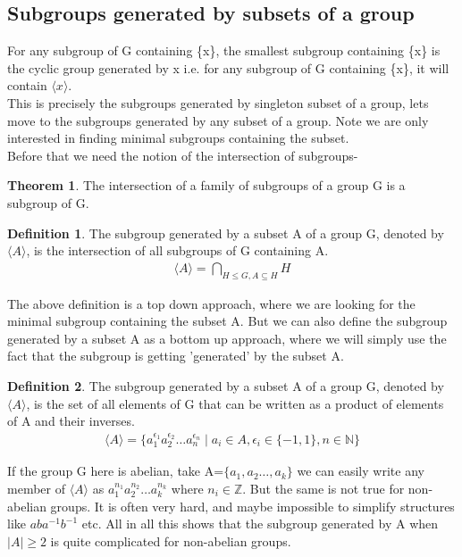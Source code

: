 \documentclass[12pt,a4paper,oneside]{report}
\theoremstyle{definition}
\newtheorem{definition}{Definition}[chapter]
\newtheorem{theorem}{Theorem}
\begin{document}
\subsection{Subgroups generated by subsets of a group}
For any subgroup of G containing \{x\}, the smallest subgroup containing \{x\} is the cyclic group generated by x i.e. for any subgroup of G containing \{x\}, it will contain $\langle x \rangle$.
\\This is precisely the subgroups generated by singleton subset of a group, lets move to the subgroups generated by any subset of a group. Note we are only interested in finding minimal subgroups containing the subset.
\\Before that we need the notion of the intersection of subgroups-
\begin{theorem}
  The intersection of a family of subgroups of a group G is a subgroup of G.
\end{theorem}
\begin{definition}
  The subgroup generated by a subset A of a group G, denoted by $\langle A \rangle$, is the intersection of all subgroups of G containing A.
  \begin{align*}
    \langle A \rangle = \bigcap_{H \leq G, A \subseteq H} H
  \end{align*}
\end{definition}
The above definition is a top down approach, where we are looking for the minimal subgroup containing the subset A. But we can also define the subgroup generated by a subset A as a bottom up approach, where we will simply use the fact that the subgroup is getting 'generated' by the subset A.
\begin{definition}
  The subgroup generated by a subset A of a group G, denoted by $\langle A \rangle$, is the set of all elements of G that can be written as a product of elements of A and their inverses.
  \begin{align*}
    \langle A \rangle = \{a_1^{\epsilon_1}a_2^{\epsilon_2} \ldots a_n^{\epsilon_n} \mid a_i \in A, \epsilon_i \in \{-1, 1\}, n \in \mathbb{N}\}
  \end{align*}
\end{definition}
If the group G here is abelian, take A=$\{a_1,a_2\ldots,a_k\}$ we can easily write any member of $\langle A \rangle$ as $a_1^{n_1}a_2^{n_2}\ldots a_k^{n_k}$ where $n_i \in \mathbb{Z}$. But the same is not true for non-abelian groups. It is often very hard, and maybe impossible to simplify structures like $aba^{-1}b^{-1}$ etc.
All in all this shows that the subgroup generated by A when $|A|\geq 2$ is quite complicated for non-abelian groups.
\end{document}
